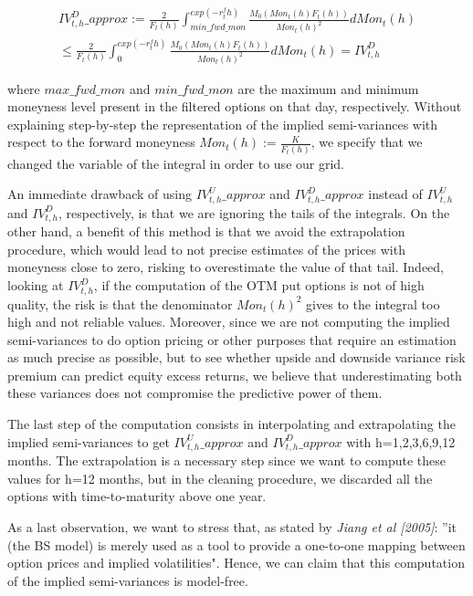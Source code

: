  \begin{equation}
 \begin{split}
 IV_{t,h}^{D}\_approx:= \frac{2}{F_{t}(h)} \int_{min\_fwd\_mon}^{exp(-r_{t}^{f}h)} \frac{M_{0}(Mon_t(h)F_{t}(h))}{Mon_t(h)^{2}}  dMon_t(h)\\
\le \frac{2}{F_{t}(h)} \int_{0}^{exp(-r_{t}^{f}h)} \frac{M_{0}(Mon_t(h)F_{t}(h))}{Mon_t(h)^{2}}  dMon_t(h)=IV_{t,h}^{D}
\end{split}
\end{equation}

where $max\_fwd\_mon$ and $min\_fwd\_mon$ are the maximum and minimum moneyness level present in the filtered options on that day, respectively. Without explaining step-by-step the representation of the implied semi-variances with respect to the forward moneyness $Mon_t(h):=\frac{K}{F_t(h)}$, we specify that we changed the variable of the integral in order to use our grid.

\vspace{4mm}
An immediate drawback of using $IV_{t,h}^{U}\_approx$ and $IV_{t,h}^{D}\_approx$ instead of $IV_{t,h}^{U}$ and $IV_{t,h}^{D}$, respectively, is that we are ignoring the tails of the integrals. On the other hand, a benefit of this method is that we avoid the extrapolation procedure, which would lead to not precise estimates of the prices with moneyness close to zero, risking to overestimate the value of that tail. Indeed, looking at $IV_{t,h}^{D}$, if the computation of the OTM put options is not of high quality, the risk is that the denominator $Mon_t(h)^2$ gives to the integral too high and not reliable values. Moreover, since we are not computing the implied semi-variances to do option pricing or other purposes that require an estimation as much precise as possible, but to see whether upside and downside variance risk premium can predict equity excess returns, we believe that underestimating both these variances does not compromise the predictive power of them.

\vspace{4mm}
The last step of the computation consists in interpolating and extrapolating the implied semi-variances to get $IV_{t,h}^{U}\_approx$ and $IV_{t,h}^{D}\_approx$ with h=1,2,3,6,9,12 months. The extrapolation is a necessary step since we want to compute these values for h=12 months, but in the cleaning procedure, we discarded all the options with time-to-maturity above one year.

\vspace{4mm}
As a last observation, we want to stress that, as stated by \textit{Jiang et al [2005]}: ''it (the BS model) is merely used as a tool to provide a one-to-one mapping between option prices and implied volatilities". Hence, we can claim that this computation of the implied semi-variances is model-free.


